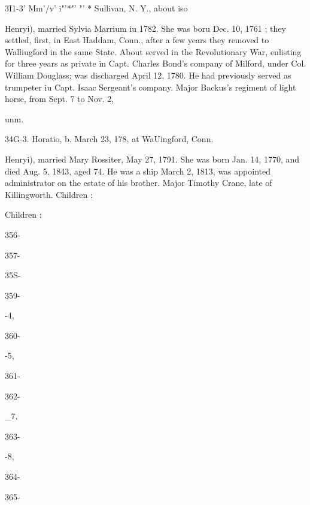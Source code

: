 \documentclass[oneside]{book}
\begin{document}
3I1-3' Mm'/v' i"'*"' "' * Sullivan, N. Y., about iso 




Henryi), married Sylvia Marrium iu 1782. She was boru Dec. 
10, 1761 ; they settled, first, in East Haddam, Conn., after a few 
years they removed to Walliugford in the same State. About 
served in the Revolutionary War, enlisting for three years as 
private in Capt. Charles Bond's company of Milford, under Col. 
William Douglass; was discharged April 12, 1780. He had 
previously served as trumpeter iu Capt. Isaac Sergeant's company. 
Major Backus's regiment of light horse, from Sept. 7 to Nov. 2, 


unm. 


34G-3. Horatio, b. March 23, 178, at WaUingford, Conn. 









Henryi), married Mary Rossiter, May 27, 1791. She was born 
Jan. 14, 1770, and died Aug. 5, 1843, aged 74. He was a ship 
March 2, 1813, was appointed administrator on the estate of his 
brother. Major Timothy Crane, late of Killingworth. Children : 












Children : 









356- 




357- 




35S- 




359- 


-4, 


360- 


-5, 


361- 




362- 


\_7. 


363- 


-8, 


364- 




365- 
\end{document}
